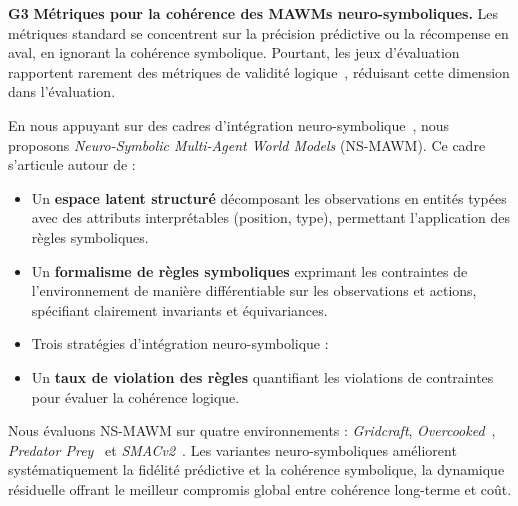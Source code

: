 \documentclass[final]{jfsma}
\theoremstyle{plain}
\theoremstyle{definition}
\theoremstyle{remark}
\begin{document}
\textbf{G3} \textbf{Métriques pour la cohérence des MAWMs neuro-symboliques.}
Les métriques standard se concentrent sur la précision prédictive ou la récompense en aval, en ignorant la cohérence symbolique. Pourtant, les jeux d'évaluation rapportent rarement des métriques de validité logique~\cite{talvitie2014modelbias, balloch2023neurosymbolicworldmodelsadapting}, réduisant cette dimension dans l'évaluation.

En nous appuyant sur des cadres d'intégration neuro-symbolique~\cite{manhaeve2018deepproblog,garcez2023neurosymbolic,Xu2018semanticloss,Fan2017differentiablelearninglogicalrules}, nous proposons \textit{Neuro-Symbolic Multi-Agent World Models} (NS-MAWM). Ce cadre s'articule autour de :
%
\begin{itemize}
  \item Un \textbf{espace latent structuré} décomposant les observations en entités typées avec des attributs interprétables (position, type), permettant l'application des règles symboliques.

  \item Un \textbf{formalisme de règles symboliques} exprimant les contraintes de l'environnement de manière différentiable sur les observations et actions, spécifiant clairement invariants et équivariances.

  \item Trois stratégies d'intégration neuro-symbolique :

  \item Un \textbf{taux de violation des règles} quantifiant les violations de contraintes pour évaluer la cohérence logique.
\end{itemize}

Nous évaluons NS-MAWM sur quatre environnements : \emph{Gridcraft}, \emph{Overcooked}~\cite{Micah2020overcooked}, \emph{Predator Prey}~\cite{lowe2017multi} et \emph{SMACv2}~\cite{Ellis2023smacv2}. Les variantes neuro-symboliques améliorent systématiquement la fidélité prédictive et la cohérence symbolique, la dynamique résiduelle offrant le meilleur compromis global entre cohérence long-terme et coût.
\end{document}
